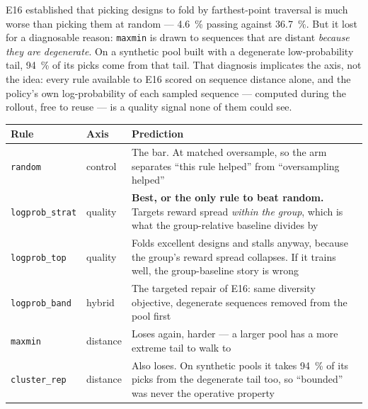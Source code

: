 
E16 established that picking designs to fold by farthest-point traversal is
much worse than picking them at random --- \SI{4.6}{\percent} passing against
\SI{36.7}{\percent}. But it lost for a diagnosable reason: \texttt{maxmin} is
drawn to sequences that are distant \emph{because they are degenerate}. On a
synthetic pool built with a degenerate low-probability tail, \SI{94}{\percent}
of its picks come from that tail. That diagnosis implicates the axis, not the
idea: every rule available to E16 scored on sequence distance alone, and the
policy's own log-probability of each sampled sequence --- computed during the
rollout, free to reuse --- is a quality signal none of them could see.

\begin{center}
\begin{tabular}{@{}llp{7.4cm}@{}}
\toprule
\textbf{Rule} & \textbf{Axis} & \textbf{Prediction} \\
\midrule
\texttt{random}        & control  & The bar. At matched oversample, so the arm
  separates ``this rule helped'' from ``oversampling helped'' \\
\texttt{logprob\_strat} & quality & \textbf{Best, or the only rule to beat
  random.} Targets reward spread \emph{within the group}, which is what the
  group-relative baseline divides by \\
\texttt{logprob\_top}   & quality & Folds excellent designs and stalls anyway,
  because the group's reward spread collapses. If it trains well, the
  group-baseline story is wrong \\
\texttt{logprob\_band}  & hybrid  & The targeted repair of E16: same diversity
  objective, degenerate sequences removed from the pool first \\
\texttt{maxmin}         & distance & Loses again, harder --- a larger pool has a
  more extreme tail to walk to \\
\texttt{cluster\_rep}   & distance & Also loses. On synthetic pools it takes
  \SI{94}{\percent} of its picks from the degenerate tail too, so
  ``bounded'' was never the operative property \\
\bottomrule
\end{tabular}
\end{center}

